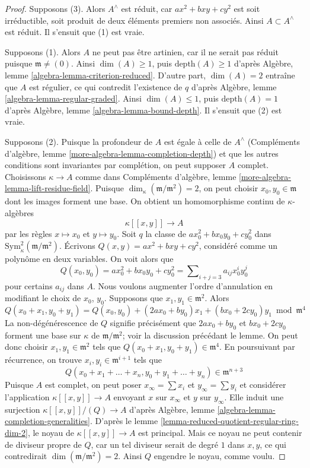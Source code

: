 \begin{proof}
Supposons (3). Alors $A^\wedge$ est réduit, car $ax^2 + bxy + cy^2$ est soit irréductible, soit produit de deux éléments premiers non associés. Ainsi $A \subset A^\wedge$ est réduit. Il s'ensuit que (1) est vraie.

\medskip\noindent
Supposons (1). Alors $A$ ne peut pas être artinien, car il ne serait pas réduit puisque $\mathfrak m \not = (0)$. Ainsi $\dim(A) \geq 1$, puis $\text{depth}(A) \geq 1$ d'après Algèbre, lemme \ref{algebra-lemma-criterion-reduced}. D'autre part, $\dim(A) = 2$ entraîne que $A$ est régulier, ce qui contredit l'existence de $q$ d'après Algèbre, lemme \ref{algebra-lemma-regular-graded}. Ainsi $\dim(A) \leq 1$, puis $\text{depth}(A) = 1$ d'après Algèbre, lemme \ref{algebra-lemma-bound-depth}. Il s'ensuit que (2) est vraie.

\medskip\noindent
Supposons (2). Puisque la profondeur de $A$ est égale à celle de $A^\wedge$ (Compléments d'algèbre, lemme \ref{more-algebra-lemma-completion-depth}) et que les autres conditions sont invariantes par complétion, on peut supposer $A$ complet. Choisissons $\kappa \to A$ comme dans Compléments d'algèbre, lemme \ref{more-algebra-lemma-lift-residue-field}. Puisque $\dim_\kappa(\mathfrak m/\mathfrak m^2) = 2$, on peut choisir $x_0, y_0 \in \mathfrak m$ dont les images forment une base. On obtient un homomorphisme continu de $\kappa$-algèbres $$
\kappa[[x, y]] \longrightarrow A
$$ par les règles $x \mapsto x_0$ et $y \mapsto y_0$. Soit $q$ la classe de $ax_0^2 + bx_0y_0 + cy_0^2$ dans $\text{Sym}^2_\kappa(\mathfrak m/\mathfrak m^2)$. Écrivons $Q(x, y) = ax^2 + bxy + cy^2$, considéré comme un polynôme en deux variables. On voit alors que $$
Q(x_0, y_0) = ax_0^2 + bx_0y_0 + cy_0^2 =
\sum\nolimits_{i + j = 3} a_{ij} x_0^iy_0^j
$$ pour certains $a_{ij}$ dans $A$. Nous voulons augmenter l'ordre d'annulation en modifiant le choix de $x_0$, $y_0$. Supposons que $x_1, y_1 \in \mathfrak m^2$. Alors $$
Q(x_0 + x_1, y_0 + y_1) = Q(x_0, y_0) +
(2ax_0 + by_0)x_1 + (bx_0 + 2cy_0)y_1 \bmod \mathfrak m^4
$$ La non-dégénérescence de $Q$ signifie précisément que $2ax_0 + by_0$ et $bx_0 + 2cy_0$ forment une base sur $\kappa$ de $\mathfrak m/\mathfrak m^2$; voir la discussion précédant le lemme. On peut donc choisir $x_1, y_1 \in \mathfrak m^2$ tels que $Q(x_0 + x_1, y_0 + y_1) \in \mathfrak m^4$. En poursuivant par récurrence, on trouve $x_i, y_i \in \mathfrak m^{i + 1}$ tels que $$
Q(x_0 + x_1 + \ldots + x_n, y_0 + y_1 + \ldots + y_n) \in \mathfrak m^{n + 3}
$$ Puisque $A$ est complet, on peut poser $x_\infty = \sum x_i$ et $y_\infty = \sum y_i$ et considérer l'application $\kappa[[x, y]] \longrightarrow A$ envoyant $x$ sur $x_\infty$ et $y$ sur $y_\infty$. Elle induit une surjection $\kappa[[x, y]]/(Q) \longrightarrow A$ d'après Algèbre, lemme \ref{algebra-lemma-completion-generalities}. D'après le lemme \ref{lemma-reduced-quotient-regular-ring-dim-2}, le noyau de $\kappa[[x, y]] \to A$ est principal. Mais ce noyau ne peut contenir de diviseur propre de $Q$, car un tel diviseur serait de degré $1$ dans $x, y$, ce qui contredirait $\dim(\mathfrak m/\mathfrak m^2) = 2$. Ainsi $Q$ engendre le noyau, comme voulu.
\end{proof}

